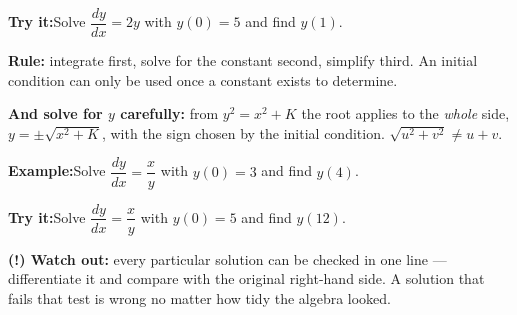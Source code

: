 \documentclass[12pt]{article}
\begin{document}
\begin{tryitbox}
\textbf{Try it:}\quad Solve $\dfrac{dy}{dx} = 2y$ with $y(0) = 5$ and find
$y(1)$.\\[2pt]
\end{tryitbox}


\begin{formulabox}
\textbf{Rule:} integrate first, solve for the constant second, simplify third.
An initial condition can only be used once a constant exists to determine.\par
\smallskip
\textbf{And solve for $y$ carefully:} from $y^{2} = x^{2} + K$ the root applies
to the \emph{whole} side, $y = \pm\sqrt{x^{2}+K}$, with the sign chosen by the
initial condition. $\sqrt{u^{2}+v^{2}} \neq u + v$.
\end{formulabox}

\begin{examplebox}
\textbf{Example:}\quad Solve $\dfrac{dy}{dx} = \dfrac{x}{y}$ with $y(0) = 3$ and
find $y(4)$.
\end{examplebox}

\begin{tryitbox}
\textbf{Try it:}\quad Solve $\dfrac{dy}{dx} = \dfrac{x}{y}$ with $y(0) = 5$ and
find $y(12)$.\\[2pt]
\end{tryitbox}

\begin{watchoutbox}
\textbf{(!) Watch out:} every particular solution can be checked in one line ---
differentiate it and compare with the original right-hand side. A solution that
fails that test is wrong no matter how tidy the algebra looked.
\end{watchoutbox}
\end{document}

